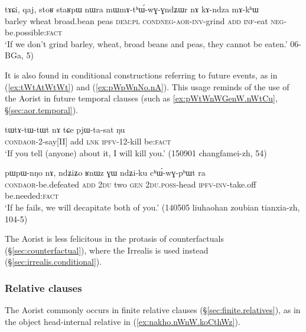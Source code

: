 \begin{exe}
\ex \label{ex:mWmAthWwGndZWr}
 \gll tɤɕi, qaj, stoʁ staʁpɯ nɯra mɯ\redp{}mɤ-tʰɯ́-wɣ-ɣndʑɯr nɤ kɤ-ndza mɤ-kʰɯ \\
 barley wheat broad.bean peas \textsc{dem}:\textsc{pl} \textsc{cond}\redp{}\textsc{neg}-\textsc{aor}-\textsc{inv}-grind \textsc{add} \textsc{inf}-eat \textsc{neg}-be.possible:\textsc{fact} \\
 \glt `If we don't grind barley, wheat, broad beans and peas, they cannot be eaten.' 06-BGa, 5)
\end{exe}

It is also found in conditional constructions referring to future events, as in (\ref{ex:tWtAtWtWt}) and (\ref{ex:pWpWnNo.nA}). This usage reminds of the use of the Aorist in future temporal clauses (such as \ref{ex:pWtWnWGenW.nWtCu}, §\ref{sec:aor.temporal}).

\begin{exe}
\ex \label{ex:tWtAtWtWt}
 \gll  tɯ\redp{}tɤ-tɯ-tɯt nɤ tɕe pjɯ-ta-sat ŋu \\
 \textsc{cond}\redp{}\textsc{aor}-2-say[II] add \textsc{lnk} \textsc{ipfv}-1\fl{}2-kill be:\textsc{fact} \\
 \glt `If you tell (anyone) about it, I will kill you.' (150901 changfamei-zh, 54)
\end{exe}

\begin{exe}
\ex \label{ex:pWpWnNo.nA}
\gll pɯ\redp{}pɯ-nŋo nɤ, ndʑiʑo ʁnɯz ɣɯ ndʑi-ku cʰɯ́-wɣ-pʰɯt ra \\
 \textsc{cond}\redp{}\textsc{aor}-be.defeated \textsc{add} \textsc{2du} two \textsc{gen} \textsc{2du}.\textsc{poss}-head \textsc{ipfv}-\textsc{inv}-take.off be.needed:\textsc{fact} \\
 \glt `If he fails, we will decapitate both of you.' (140505 liuhaohan zoubian tianxia-zh, 104-5)
\end{exe}

The Aorist is less felicitous in the protasis of counterfactuals (§\ref{sec:counterfactual}), where the Irrealis is used instead (§\ref{sec:irrealis.conditional}).

\subsubsection{Relative clauses }   \label{sec:aor.relative}
The Aorist commonly occurs in finite relative clauses (§\ref{sec:finite.relatives}), as in the object head-internal relative in (\ref{ex:nakho.nWnW.koCthWz}).


